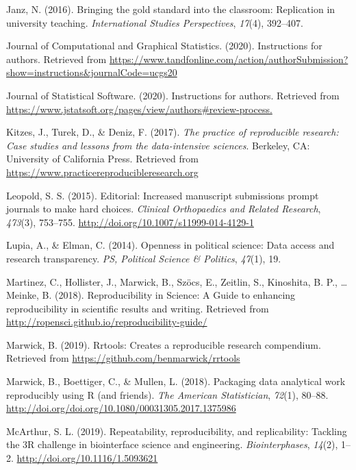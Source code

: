 \documentclass[12pt,twoside]{reedthesis}
\begin{document}
\hypertarget{ref-janz2016bringing}{}
Janz, N. (2016). Bringing the gold standard into the classroom:
Replication in university teaching. \emph{International Studies
Perspectives}, \emph{17}(4), 392--407.

\hypertarget{ref-jcgs-guide}{}
Journal of Computational and Graphical Statistics. (2020). Instructions
for authors. Retrieved from
\url{https://www.tandfonline.com/action/authorSubmission?show=instructions\&journalCode=ucgs20}

\hypertarget{ref-jss-guide}{}
Journal of Statistical Software. (2020). Instructions for authors.
Retrieved from
\url{https://www.jstatsoft.org/pages/view/authors\#review-process.}

\hypertarget{ref-kitzes2017practice}{}
Kitzes, J., Turek, D., \& Deniz, F. (2017). \emph{The practice of
reproducible research: Case studies and lessons from the data-intensive
sciences}. Berkeley, CA: University of California Press. Retrieved from
\url{https://www.practicereproducibleresearch.org}

\hypertarget{ref-leopold2015increased}{}
Leopold, S. S. (2015). Editorial: Increased manuscript submissions
prompt journals to make hard choices. \emph{Clinical Orthopaedics and
Related Research}, \emph{473}(3), 753--755.
\url{http://doi.org/10.1007/s11999-014-4129-1}

\hypertarget{ref-lupia2014openness}{}
Lupia, A., \& Elman, C. (2014). Openness in political science: Data
access and research transparency. \emph{PS, Political Science \&
Politics}, \emph{47}(1), 19.

\hypertarget{ref-r-opensci}{}
Martinez, C., Hollister, J., Marwick, B., Szöcs, E., Zeitlin, S.,
Kinoshita, B. P., \ldots{} Meinke, B. (2018). Reproducibility in
Science: A Guide to enhancing reproducibility in scientific results and
writing. Retrieved from
\url{http://ropensci.github.io/reproducibility-guide/}

\hypertarget{ref-R-rrtools}{}
Marwick, B. (2019). Rrtools: Creates a reproducible research compendium.
Retrieved from \url{https://github.com/benmarwick/rrtools}

\hypertarget{ref-marwick2018packaging}{}
Marwick, B., Boettiger, C., \& Mullen, L. (2018). Packaging data
analytical work reproducibly using R (and friends). \emph{The American
Statistician}, \emph{72}(1), 80--88.
\url{http://doi.org/doi.org/10.1080/00031305.2017.1375986}

\hypertarget{ref-engineering-reproducibility}{}
McArthur, S. L. (2019). Repeatability, reproducibility, and
replicability: Tackling the 3R challenge in biointerface science and
engineering. \emph{Biointerphases}, \emph{14}(2), 1--2.
\url{http://doi.org/10.1116/1.5093621}
\end{document}
